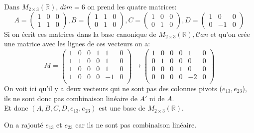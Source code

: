 \begin{exemple}
Dans $M_{2 \times 3}(\mathbb{R})$, $dim = 6$ on prend les quatre matrices:
\[A = \begin{pmatrix}
    1 & 0 & 0 \\ 1 & 1 & 0
\end{pmatrix} ,  B = \begin{pmatrix}
    1 & 1 & 0 \\ 0 & 1 & 0
\end{pmatrix}, C  = \begin{pmatrix}
    1 & 0 & 0 \\ 0 & 1 & 0
\end{pmatrix}, D = \begin{pmatrix}
    1 & 0 & 0 \\ 0 & -1 & 0
\end{pmatrix}\]
Si on écrit ces matrices dans la base canonique de $M_{2\times 3}(\mathbb{R}), \mathcal{C}an$ et qu'on crée une matrice avec les lignes de ces vecteurs on a:
\[M = \begin{pmatrix}
    1 & 0 & 0 & 1 & 1 & 0\\
    1 & 1 & 0 & 0 & 1 & 0\\
    1 & 0 & 0 & 0 & 1 & 0 \\
    1 & 0 & 0 & 0 & - 1 & 0 \\
\end{pmatrix} \to \begin{pmatrix}
    1 & 0 & 0 & 0 & 1 & 0\\
    0 & 1 & 0 & 0 & 0 & 0\\
    0 & 0 & 0 & 1 & 0 & 0 \\
    0 & 0 & 0 & 0 & - 2 & 0 \\
\end{pmatrix} \]
On voit ici qu'il y a deux vecteurs qui ne sont pas des colonnes pivots ($e_{13}, e_{23}$), ils ne sont donc pas combinaison linéaire de $A'$ ni de $A$.
\\
Et donc $(A, B, C, D, e_{13}, e_{23})$ est une base de $M_{2\times 3}(\mathbb{R})$.
\begin{framedremark}
    On a rajouté $e_{13}$ et $e_{23}$ car ils ne sont pas combinaison linéaire.
\end{framedremark}
\end{exemple}

